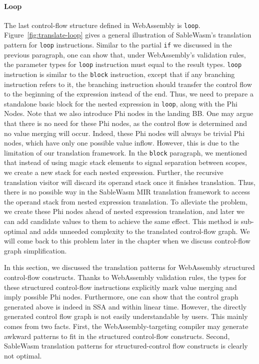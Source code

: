 \paragraph{Loop} The last control-flow structure defined in WebAssembly is \texttt{loop}. Figure~\ref{fig:translate-loop} gives a general illustration of SableWasm's translation pattern for \texttt{loop} instructions. Similar to the partial \texttt{if} we discussed in the previous paragraph, one can show that, under WebAssembly's validation rules, the parameter types for \texttt{loop} instruction must equal to the result types. \texttt{loop} instruction is similar to the \texttt{block} instruction, except that if any branching instruction refers to it, the branching instruction should transfer the control flow to the beginning of the expression instead of the end. Thus, we need to prepare a standalone basic block for the nested expression in \texttt{loop}, along with the Phi Nodes. Note that we also introduce Phi nodes in the landing BB. One may argue that there is no need for these Phi nodes, as the control flow is determined and no value merging will occur. Indeed, these Phi nodes will always be trivial Phi nodes, which have only one possible value inflow. However, this is due to the limitation of our translation framework. In the \texttt{block} paragraph, we mentioned that instead of using magic stack elements to signal separation between scopes, we create a new stack for each nested expression. Further, the recursive translation visitor will discard its operand stack once it finishes translation. Thus, there is no possible way in the SableWasm MIR translation framework to access the operand stack from nested expression translation. To alleviate the problem, we create these Phi nodes ahead of nested expression translation, and later we can add candidate values to them to achieve the same effect. This method is sub-optimal and adds unneeded complexity to the translated control-flow graph. We will come back to this problem later in the chapter when we discuss control-flow graph simplification.

In this section, we discussed the translation patterns for WebAssembly structured control-flow constructs. Thanks to WebAssembly validation rules, the types for these structured control-flow instructions explicitly mark value merging and imply possible Phi nodes. Furthermore, one can show that the control graph generated above is indeed in SSA and within linear time. However, the directly generated control flow graph is not easily understandable by users. This mainly comes from two facts. First, the WebAssembly-targeting compiler may generate awkward patterns to fit in the structured control-flow constructs. Second, SableWasm translation patterns for structured-control flow constructs is clearly not optimal.